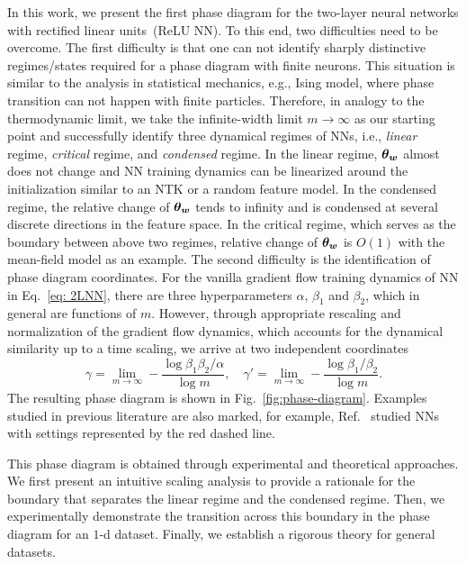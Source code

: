 \documentclass{article}
\begin{document}
In this work, we present the first phase diagram for the two-layer neural networks with rectified linear units~(ReLU NN). To this end, two difficulties need to be overcome. The first difficulty is that one can not identify sharply distinctive regimes/states required for a phase diagram with finite neurons. This situation is similar to the analysis in statistical mechanics, e.g., Ising model, where phase transition can not happen with finite particles. Therefore, in analogy to the thermodynamic limit, we take the infinite-width limit $m\to\infty$ as our starting point and successfully identify three dynamical regimes of NNs, i.e., \emph{linear} regime, \emph{critical} regime, and \emph{condensed} regime. In the linear regime, $\bm{\theta}_{\bm{w}}$ almost does not change and NN training dynamics can be linearized around the initialization similar to an NTK or a random feature model. In the condensed regime, the relative change of $\bm{\theta}_{\bm{w}}$ tends to infinity and is condensed at several discrete directions in the feature space. In the critical regime, which serves as the boundary between above two regimes, relative change of $\bm{\theta}_{\bm{w}}$ is $O(1)$ with the mean-field model as an example. The second difficulty is the identification of phase diagram coordinates. For the vanilla gradient flow training dynamics of NN in Eq.~\eqref{eq: 2LNN}, there are three hyperparameters $\alpha$, $\beta_1$ and $\beta_2$, which in general are functions of $m$. However, through appropriate rescaling and normalization of the gradient flow dynamics, which accounts for the dynamical similarity up to a time scaling, we arrive at two independent coordinates
\begin{equation}
    \gamma=\lim\limits_{m\to\infty}-\frac{\log\beta_1\beta_2/\alpha}{\log m}, \quad \gamma'=\lim\limits_{m\to\infty}-\frac{\log\beta_1/\beta_2}{\log m}.
\end{equation}
The resulting phase diagram is shown in Fig.~\ref{fig:phase-diagram}. Examples studied in previous literature are also marked, for example, Ref.~\cite{e2020comparative} studied NNs with settings represented by the red dashed line.

This phase diagram is obtained through experimental and theoretical approaches. We first present an intuitive scaling analysis to provide a rationale for the boundary that separates the linear regime and the condensed regime. Then, we experimentally demonstrate the transition across this boundary in the phase diagram for an $1$-d dataset. Finally, we establish a rigorous theory for general datasets.
\end{document}
